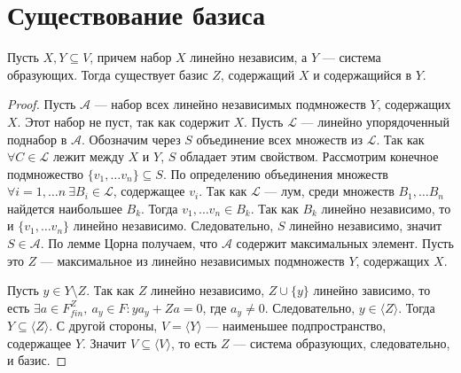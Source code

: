 \documentclass[11pt]{book}
\theoremstyle{definition}
\theoremstyle{plain}
\theoremstyle{plain}
\theoremstyle{definition}
\theoremstyle{remark}
\begin{document}
\section{Существование базиса}
\begin{thm}
    Пусть $ X, Y \subseteq V$, причем набор $ X$ линейно независим, а  $ Y$ --- система образующих. Тогда существует базис  $ Z$, содержащий  $ X$ и содержащийся в  $ Y$.
\end{thm}
\begin{proof}
    Пусть $ \mathscr{A}$ --- набор всех линейно независимых подмножеств $ Y$, содержащих $ X$.  Этот набор не пуст, так как содержит  $ X$.
    Пусть  $ \mathscr L$ --- линейно упорядоченный поднабор в  $ \mathscr A$. Обозначим через $ S$ объединение всех множеств из  $ \mathscr L$.
    Так как $    \forall C \in \mathscr L
    $ лежит между  $ X$ и  $ Y$, $ S$ обладает этим свойством.
    Рассмотрим конечное подмножество $ \{v_1, \ldots v_n\} \subseteq S$. По определению объединения множеств $ \forall i = 1, \ldots n ~ \exists B_i \in \mathscr L$, содержащее $ v_i$. Так как  $ \mathscr L$ --- лум, среди множеств $ B_1, \ldots B_n$ найдется наибольшее $ B_k$. Тогда $ v_1, \ldots v_n \in B_k$. Так как $ B_k$ линейно независимо, то и  $ \{v_1, \ldots v_n\}$ линейно независимо. Следовательно, $ S$ линейно независимо, значит  $ S \in \mathscr A$.
    По лемме Цорна получаем, что $ \mathscr A$ содержит максимальных элемент. Пусть это  $ Z$ --- максимальное из линейно независимых подмножеств $ Y$, содержащих  $ X$.

    Пусть $ y \in Y \setminus Z$. Так как $ Z$ линейно независимо,  $ Z \cup \{y\}$ линейно зависимо, то есть $ \exists a \in F^{Z}_{fin}, ~a_y \in F: ya_y + Za = 0$, где $ a_y \ne 0$. Следовательно, $ y \in \langle Z \rangle$. Тогда $ Y \subseteq \langle Z \rangle$. С другой стороны, $ V = \langle Y \rangle$ --- наименьшее подпространство,  содержащее $ Y$. Значит  $ V \subseteq \langle V \rangle $, то есть $ Z$ --- система образующих, следовательно, и базис.
\end{proof}
\end{document}
